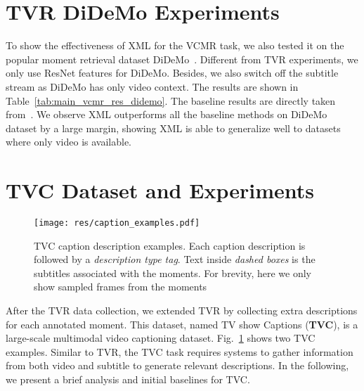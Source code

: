 \documentclass[runningheads]{llncs}
\begin{document}
\section{TVR DiDeMo Experiments}\label{didemo_experiments}
To show the effectiveness of XML for the VCMR task, we also tested it on the popular moment retrieval dataset DiDeMo~\cite{anne2017localizing}. 
Different from TVR experiments, we only use ResNet features for DiDeMo. 
Besides, we also switch off the subtitle stream as DiDeMo has only video context.
The results are shown in Table~\ref{tab:main_vcmr_res_didemo}. 
The baseline results are directly taken from~\cite{escorcia2019temporal}. 
We observe XML outperforms all the baseline methods on DiDeMo dataset by a large margin, showing XML is able to generalize well to datasets where only video is available.
 \section{TVC Dataset and Experiments}\label{sec:tvc}


\begin{figure}[!t]
  \centering
  \texttt{[image: res/caption\_examples.pdf]}
  \caption{TVC caption description examples. Each caption description is followed by a \textit{description type tag}. Text inside \textit{dashed boxes} is the subtitles associated with the moments. For brevity, here we only show sampled frames from the moments}
  \label{fig:tvc_examples}
\end{figure}


After the TVR data collection, we extended TVR by collecting extra descriptions for each annotated moment. 
This dataset, named TV show Captions (\textbf{TVC}), is a large-scale multimodal video captioning dataset.
Fig.~\ref{fig:tvc_examples} shows two TVC examples.
Similar to TVR, the TVC task requires systems to gather information from both video and subtitle to generate relevant descriptions.
In the following, we present a brief analysis and initial baselines for TVC.
\end{document}
